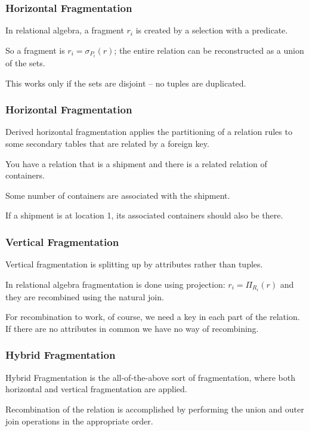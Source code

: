 \begin{frame}
\frametitle{Horizontal Fragmentation}

In relational algebra, a fragment $r_{i}$ is created by a selection with a predicate. 

So a fragment is $r_{i} = \sigma_{P_{i}}(r)$; the entire relation can be reconstructed as a union of the sets. 

This works only if the sets are disjoint -- no tuples are duplicated. 

\end{frame}


\begin{frame}
\frametitle{Horizontal Fragmentation}

\alert{Derived horizontal fragmentation} applies the partitioning of a relation rules to some secondary tables that are related by a foreign key. 

You have a relation that is a shipment and there is a related relation of containers. 

Some number of containers are associated with the shipment.

If a shipment is at location 1, its associated containers should also be there.

\end{frame}

\begin{frame}
\frametitle{Vertical Fragmentation}

\alert{Vertical fragmentation} is splitting up by attributes rather than tuples. 

In relational algebra fragmentation is done using projection: $r_{i} = \Pi_{R_{i}}
(r)$ and they are recombined using the natural join. 

For recombination to work, of course, we need a key in each part of the relation. If there are no attributes in common we have no way of recombining. 

\end{frame}



\begin{frame}
\frametitle{Hybrid Fragmentation}

\alert{Hybrid Fragmentation} is the all-of-the-above sort of fragmentation, where both horizontal and vertical fragmentation are applied. 

Recombination of the relation is accomplished by performing the union and outer join operations in the appropriate order.


\end{frame}

